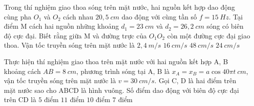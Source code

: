 	\begin{ex}%
		Trong thí nghiệm giao thoa sóng trên mặt nước, hai nguồn kết hợp dao động cùng pha $O_1$ và $O_2$ cách nhau $20,5\ cm$ dao động với cùng tần số $f=15\ Hz$. Tại điểm M cách hai nguồn những khoảng $d_1 =23\ cm$ và $d_2=26,2\ cm$ sóng có biên độ cực đại. Biết rằng giữa M và đường trực của $O_1O_2$ còn một đường cực đại giao thoa. Vận tốc truyền sóng trên mặt nước là
		\choice
		{$2,4\ m/s$}
		{$16\ cm/s$}
		{$48\ cm/s$}
		{\True $24\ cm/s$}
	\end{ex}
	\begin{ex}%
		Thực hiện thí nghiệm giao thoa trên mặt nước với hai nguồn kết hợp A, B khoảng cách $AB=8\ cm$, phương trình sóng tại A, B là $x_A=x_B=a\cos40\pi t\ cm$, vận tốc truyền sóng trên mặt nước là $v=30\ cm/s$. Gọi C, D là hai điểm trên mặt nước sao cho ABCD là hình vuông. Số điểm dao động với biên độ cực đại trên CD là
		\choice
		{\True $5$ điểm}
		{$11$ điểm}
		{$10$ điểm}
		{$7$ điểm}
	\end{ex}
